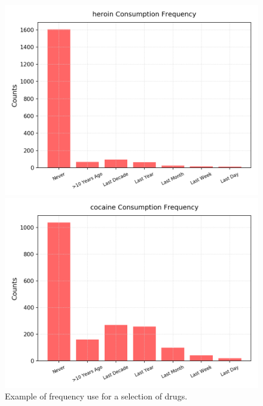 \documentclass{article}
\begin{document}
\begin{figure}[h!]
\begin{minipage}[b]{0.32\textwidth}
\end{minipage}
\begin{minipage}[b]{0.32\textwidth}
	\includegraphics[width=\textwidth]{plots/drugsPlots/heroin_freq.png}
	
\end{minipage}
\begin{minipage}[b]{0.32\textwidth}
	\includegraphics[width=\textwidth]{plots/drugsPlots/cocaine_freq.png}
\end{minipage}

	\caption{Example of frequency use for a selection of drugs.}
\label{drugs1}
\end{figure}
\end{document}

